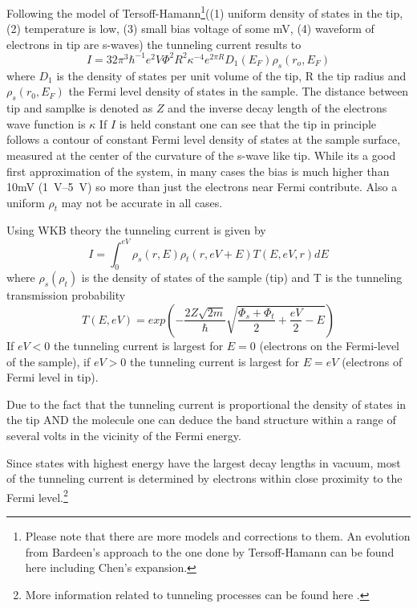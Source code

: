 Following the model of  Tersoff-Hamann\footnote{Please note that there are more models and corrections to them. An evolution from Bardeen's approach to the one done by Tersoff-Hamann can be found here \cite{lounis_theory_2014, wortmann_interpretation_200} including Chen’s expansion.}((1) uniform density of states in the tip, (2) temperature is low, (3) small bias voltage of some mV, (4) waveform of electrons in tip are s-waves) the tunneling current results to 
$$I=32\pi^3\hbar^{-1}e^2V\Phi^2 R^2\kappa^{-4}e^{2\pi R}D_1(E_F)\rho_s(r_o,E_F)$$ where $D_1$ is the density of states per unit volume of the tip, R the tip radius and $\rho_s(r_0,E_F)$ the Fermi level density of states in the sample\cite{bonnell_scanning_1993}. The distance between tip and samplke is denoted as $Z$ and the inverse decay length of the electrons wave function is $\kappa$ If $I$ is held constant one can see that the tip in principle follows a contour of constant Fermi level density of states at the sample surface, measured at the center of the curvature of the s-wave like tip. While its a good first approximation of the system, in many cases the bias is much higher than 10mV (\SIrange{1}{5}{\V}) so more than just the electrons near Fermi contribute. Also a uniform $\rho_t$ may not be accurate in all cases.

Using  WKB theory\cite{wentzel_verallgemeinerung_1926, kramers_wellenmechanik_1926, brillouin_mecanique_1926} the tunneling current is given by
\begin{equation}
I=\int_0^{eV}\rho_s(r,E)\rho_t(r,eV+E)T(E,eV,r)dE
\label{WKB}
\end{equation}
where $\rho_s(\rho_t)$ is the density of states of the sample (tip) and T is the tunneling transmission probability
\begin{equation}
T(E,eV)=exp\left(-\frac{2Z\sqrt{2m}}{\hbar}\sqrt{\frac{\Phi_s+\Phi_t}{2}+\frac{eV}{2}-E}\right)
\label{Transmission-function} 
\end{equation}
If $eV<0$ the tunneling current is largest for $E=0$ (electrons on the Fermi-level of the sample), if $eV>0$ the tunneling current is largest for $E=eV$ (electrons of Fermi level in tip).

Due to the fact that the tunneling current is proportional the density of states in the tip AND the molecule one can deduce the band structure within a range of several volts in the vicinity of the Fermi energy.

Since states with highest energy have the largest decay lengths in vacuum, most of the tunneling current is determined by electrons within close proximity to the Fermi level.\footnote{More information related to tunneling processes can be found here \cite{bonnell_scanning_1993}.}

